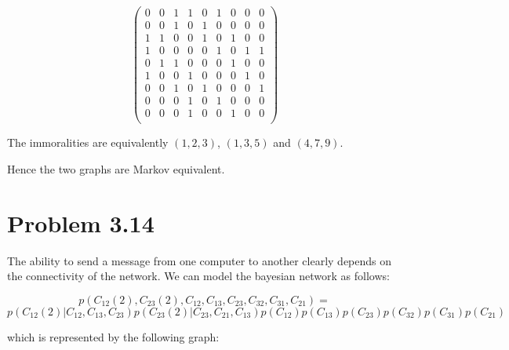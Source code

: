 \documentclass[11pt,a4paper,oneside]{report}
\begin{document}
\begin{equation}
\begin{pmatrix}
 0 & 0 & 1 & 1 & 0 & 1 & 0 & 0 & 0 \\
 0 & 0 & 1 & 0 & 1 & 0 & 0 & 0 & 0 \\
 1 & 1 & 0 & 0 & 1 & 0 & 1 & 0 & 0 \\
 1 & 0 & 0 & 0 & 0 & 1 & 0 & 1 & 1 \\
 0 & 1 & 1 & 0 & 0 & 0 & 1 & 0 & 0 \\
 1 & 0 & 0 & 1 & 0 & 0 & 0 & 1 & 0 \\
 0 & 0 & 1 & 0 & 1 & 0 & 0 & 0 & 1 \\
 0 & 0 & 0 & 1 & 0 & 1 & 0 & 0 & 0 \\
 0 & 0 & 0 & 1 & 0 & 0 & 1 & 0 & 0 \\
\end{pmatrix}
\end{equation}

The immoralities are equivalently $\left( 1, 2, 3\right)$, $\left( 1, 3, 5 \right)$ and
$\left( 4, 7, 9 \right)$.

Hence the two graphs are Markov equivalent.

\section*{Problem 3.14}

The ability to send a message from one computer to another clearly depends 
on the connectivity of the network. We can model the bayesian network as 
follows:

$$ p(C_{12}(2), C_{23}(2), C_{12}, C_{13}, C_{23}, C_{32}, C_{31}, C_{21}) = $$
$$ p(C_{12}(2) | C_{12}, C_{13}, C_{23} )p(C_{23}(2) | C_{23}, C_{21}, 
C_{13} )p(C_{12})p(C_{13})p(C_{23})p(C_{32})p(C_{31})p(C_{21})$$

which is represented by the following graph:
\end{document}
